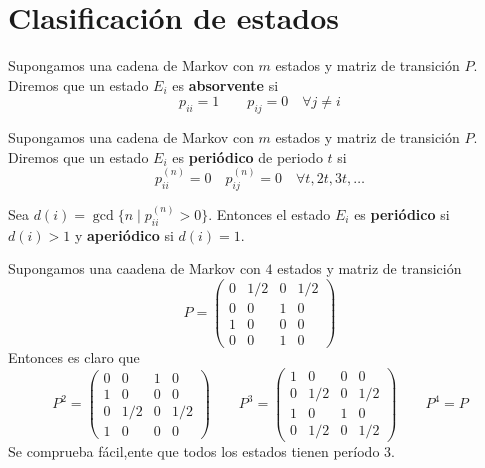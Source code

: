 \documentclass[PREyA.tex]{subfiles}
\begin{document}
\section{Clasificación de estados}
\begin{defi}
Supongamos una cadena de Markov con $m$ estados y matriz de transición $P$. Diremos que un estado $E_i$ es \textbf{absorvente} si 
$$
p_{ii} = 1 \qquad p_{ij} = 0 \quad \forall j \neq i
$$
\end{defi}
\begin{defi}
Supongamos una cadena de Markov con $m$ estados y matriz de transición $P$. Diremos que un estado $E_i$ es \textbf{periódico} de periodo $t$ si 
$$
p_{ii}^{(n)} = 0  \quad p_{ij}^{(n)} = 0 \quad \forall t,2t,3t,\dotsc
$$
\end{defi}
\begin{defi}
Sea $d(i) = \gcd\{n\mid p_{ii}^{(n)}>0\}$. Entonces el estado $E_i$ es \textbf{periódico} si $d(i)>1$ y \textbf{aperiódico} si $d(i)=1$.
\end{defi}
\begin{example}
Supongamos una caadena de Markov con $4$ estados y matriz de transición
$$P = 
\begin{pmatrix}
0 & 1/2 & 0 & 1/2\\
0 & 0  & 1 & 0\\
1 & 0 & 0 & 0\\
0 & 0 & 1 & 0
\end{pmatrix}
$$
Entonces es claro que
$$P^2 = 
\begin{pmatrix}
0 & 0 & 1 & 0\\
1 & 0  & 0 & 0\\
0 & 1/2 & 0 & 1/2 \\
1 & 0 & 0 & 0
\end{pmatrix} \qquad P^3= \begin{pmatrix}
1 & 0 & 0 & 0\\
0 & 1/2  & 0 & 1/2\\
1 & 0 & 1 & 0\\
0 & 1/2 & 0 & 1/2
\end{pmatrix}
\qquad P^4 = P
$$
Se comprueba fácil,ente que todos los estados tienen período $3$.
\end{example}
\end{document}
